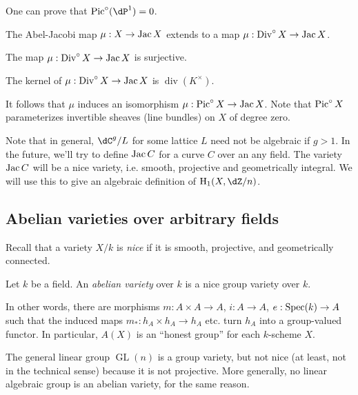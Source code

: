\documentclass{article}
\begin{document}
\begin{example}
One can prove that $\picard^\circ(\dP^1) = 0$.
\end{example}

The Abel-Jacobi map $\mu:X\to \operatorname{Jac} X$ extends to a map 
$\mu:\operatorname{Div}^\circ X\to \operatorname{Jac} X$. 

\begin{theorem}[Jacobi]
The map $\mu:\operatorname{Div}^\circ X\to\operatorname{Jac} X$ is surjective.
\end{theorem}

\begin{theorem}[Abel]
The kernel of $\mu:\operatorname{Div}^\circ X\to \operatorname{Jac} X$ is $\operatorname{div}(K^\times)$. 
\end{theorem}

It follows that $\mu$ induces an isomorphism $\mu:\operatorname{Pic}^\circ X\to \operatorname{Jac} X$. 
Note that $\operatorname{Pic}^\circ X$ parameterizes invertible sheaves (line bundles) on 
$X$ of degree zero. 

Note that in general, $\dC^g/L$ for some lattice $L$ need not be 
algebraic if $g>1$. In the future, we'll try to define $\operatorname{Jac} C$ for a curve 
$C$ over an any field. The variety $\operatorname{Jac} C$ will be a nice variety, i.e. 
smooth, projective and geometrically integral. We will use this to give an 
algebraic definition of $\h_1(X,\dZ/n)$. 





\subsection*{Abelian varieties over arbitrary fields}

Recall that a variety $X/k$ is \emph{nice} if it is smooth, projective, and 
geometrically connected. 

\begin{definition}
Let $k$ be a field. An \emph{abelian variety} over $k$ is a nice group variety 
over $k$.
\end{definition}

In other words, there are morphisms $m:A\times A\to A$, $i:A\to A$, 
$e:\operatorname{Spec}(k)\to A$ such that the induced maps $m_*:h_A\times h_A\to h_A$ etc. 
turn $h_A$ into a group-valued functor. In particular, $A(X)$ is an ``honest  
group'' for each $k$-scheme $X$. 

\begin{example}
The general linear group $\operatorname{GL}(n)$ is a group variety, but not 
nice (at least, not in the technical sense) because it is not projective. More 
generally, no linear algebraic group is an abelian variety, for the same 
reason. 
\end{example}
\end{document}
